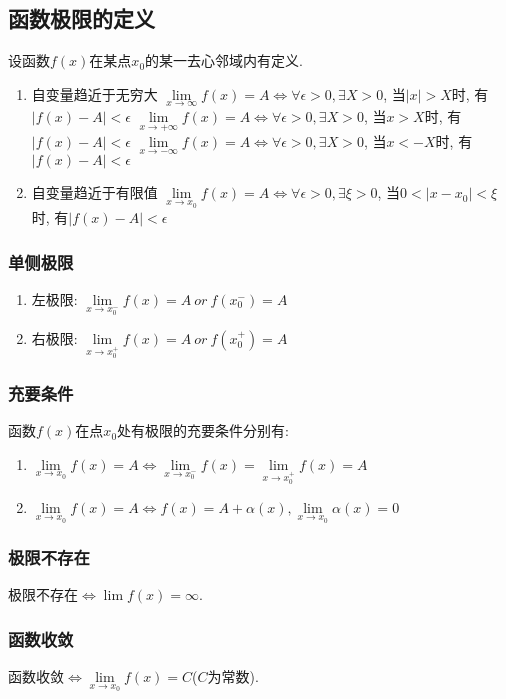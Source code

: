 \subsection{函数极限的定义}
设函数$ f(x) $在某点$ x_{0} $的某一去心邻域内有定义.
\begin{enumerate}
\item 自变量趋近于无穷大
\subitem $ \lim\limits_{x\rightarrow \infty}f(x)=A\Leftrightarrow \forall \epsilon >0, \exists X>0 $, 当$ |x|>X $时, 有$ |f(x)-A|<\epsilon $
\subitem $ \lim\limits_{x\rightarrow +\infty}f(x)=A\Leftrightarrow \forall \epsilon >0, \exists X>0 $, 当$ x>X $时, 有$ |f(x)-A|<\epsilon $
\subitem $ \lim\limits_{x\rightarrow -\infty}f(x)=A\Leftrightarrow \forall \epsilon >0, \exists X>0 $, 当$ x<-X $时, 有$ |f(x)-A|<\epsilon $
\item 自变量趋近于有限值
\subitem $ \lim\limits_{x\rightarrow x_{0}}f(x)=A\Leftrightarrow \forall \epsilon >0, \exists \xi>0 $, 当$ 0<|x-x_{0}|<\xi $时, 有$ |f(x)-A|<\epsilon $
\end{enumerate}
\subsubsection{单侧极限}
\begin{enumerate}
\item 左极限: $ \lim\limits_{x\rightarrow x_{0}^{-}}f(x)=A\ or\ f(x_{0}^{-})=A $
\item 右极限: $ \lim\limits_{x\rightarrow x_{0}^{+}}f(x)=A\ or\ f(x_{0}^{+})=A $
\end{enumerate}
\subsubsection{充要条件}
函数$ f(x) $在点$ x_{0} $处有极限的充要条件分别有:
\begin{enumerate}
\item $ \lim\limits_{x\rightarrow x_{0}}f(x)=A\Leftrightarrow \lim\limits_{x\rightarrow x_{0}^{-}}f(x)=\lim\limits_{x\rightarrow x_{0}^{+}}f(x)=A $
\item $ \lim\limits_{x\rightarrow x_{0}}f(x)=A\Leftrightarrow f(x)=A+\alpha(x), \lim\limits_{x\rightarrow x_{0}}\alpha(x)=0 $
\end{enumerate}
\subsubsection{极限不存在}
极限不存在$ \Leftrightarrow \lim\limits f(x)=\infty $.
\subsubsection{函数收敛}
函数收敛$ \Leftrightarrow \lim\limits_{x \rightarrow x_{0}}f(x)=C $($ C $为常数).
